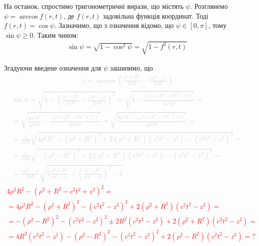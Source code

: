 На останок, спростимо тригонометричні вирази, що містять $ \psi $. Розглянемо 
$ \psi = \arccos f(r,t) $, де $ f(r,t) $ задовільна функція координат. 
Тоді $ f(r,t) = \cos \psi $. Зазначимо, що з означення відомо, що 
$ \psi \in \left[ 0, \pi \right] $, тому $ \sin \psi \geq 0 $. Таким чином:
%
\begin{equation*} \begin{aligned}
\sin \psi = \sqrt{1 - \cos^2 \psi } = \sqrt{1 - f^2(r,t)}
\end{aligned} \end{equation*}

Згадуючи введене означення для $ \psi $ зашипимо, що
%
\textcolor{lightgray}{ \begin{equation*} \begin{aligned}
\psi = \arccos \left( \frac{\rho^2 + R^2}{2 \rho R} - 
\frac{c^2 t^2 - z^2}{2 \rho R} \right)
\end{aligned} \end{equation*} }
%
\textcolor{lightgray}{ \begin{equation*} \begin{aligned}
\sin \psi = \sqrt{1 - \left( \frac{\rho^2 + R^2}{2 \rho R} - 
\frac{c^2 t^2 - z^2}{2 \rho R} \right)^2} = 
\sqrt{1 - \frac{\left( \rho^2 + R^2 - c^2 t^2 + z^2 \right)^2}
{4 \rho^2 R^2} } = \\ = \sqrt{\frac{4 \rho^2 R^2}{4 \rho^2 R^2} - 
\frac{\left( \rho^2 + R^2 - c^2 t^2 + z^2 \right)^2}{4 \rho^2 R^2} } =
\sqrt{\frac{4 \rho^2 R^2 - \left( \rho^2 + R^2 - c^2 t^2 + z^2 \right)^2}
{4 \rho^2 R^2}} = \\
= \frac{1}{2 \rho R} \sqrt{4 \rho^2 R^2 - \left( \rho^2 + R^2 \right)^2 +
2 \left( \rho^2 + R^2 \right) \left( c^2 t^2 - z^2 \right) - 
\left( c^2 t^2 - z^2 \right)^2} = \\
= \frac{1}{2 \rho R} \sqrt{- \left( \rho^2 - R^2 \right)^2 +
2 \left( \rho^2 + R^2 \right) \left( c^2 t^2 - z^2 \right) - 
\left( c^2 t^2 - z^2 \right)^2} = \\
= \frac{c^2 t^2 - z^2}{2 \rho R} \sqrt{2 \frac{\rho^2 + R^2 }{c^2 t^2 - z^2} - 
\left( \frac{\rho^2 - R^2 }{c^2 t^2 - z^2} \right)^2 - 1}
\end{aligned} \end{equation*} }
%
\textcolor{red}{ \begin{equation*} \begin{aligned}
4 \rho^2 R^2 - (\rho^2 + R^2 - c^2 t^2 + z^2)^2 = \\
= 4 \rho^2 R^2 - (\rho^2 + R^2)^2 - (c^2 t^2 - z^2)^2 + 
2 (\rho^2 + R^2) (c^2 t^2 - z^2) = \\
= - (\rho^2 - R^2)^2 - (c^2 t^2 - z^2)^2 \pm 
2 R^2 (c^2 t^2 - z^2) + 2 (\rho^2 + R^2) (c^2 t^2 - z^2) = \\
= 4 R^2 (c^2 t^2 - z^2) - (\rho^2 - R^2)^2 - (c^2 t^2 - z^2)^2 +
2 (\rho^2 - R^2) (c^2 t^2 - z^2) = ?
\end{aligned} \end{equation*} }
